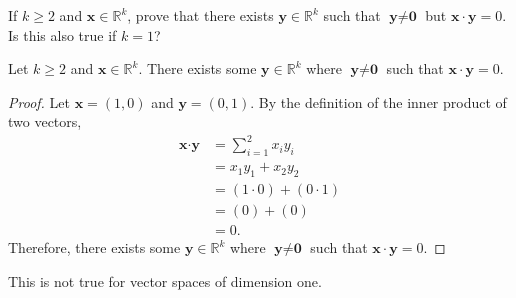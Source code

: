 \begin{exercise}
	If $k \geq 2$ and $\textbf{x} \in \mathbb{R}^k$, prove that there exists $\textbf{y} \in \mathbb{R}^k$ such that $\textbf{y} \neq \textbf{0}$ but $\textbf{x} \cdot \textbf{y} = 0$. Is this also true if $k = 1$?
\end{exercise}
\begin{proposition}
	Let $k \geq 2$ and $\textbf{x} \in \mathbb{R}^k$. There exists some $\textbf{y} \in \mathbb{R}^k$ where $\textbf{y} \neq \textbf{0}$ such that $\textbf{x} \cdot \textbf{y} = 0$.
\end{proposition}
\begin{proof}
	Let $\textbf{x} = \left( 1, 0 \right)$ and $\textbf{y} = \left( 0, 1 \right)$. By the definition of the inner product of two vectors,
	\begin{align*}
	\textbf{x} \cdot \textbf{y} &= \sum_{i=1}^{2} x_iy_i \\
	&= x_1y_1 + x_2y_2 \\
	&= \left( 1 \cdot 0 \right) + \left( 0 \cdot 1 \right) \\
	&= \left( 0 \right) + \left( 0 \right) \\
	&= 0.
	\end{align*}
	Therefore, there exists some $\textbf{y} \in \mathbb{R}^k$ where $\textbf{y} \neq \textbf{0}$ such that $\textbf{x} \cdot \textbf{y} = 0$.
\end{proof}

This is not true for vector spaces of dimension one.
